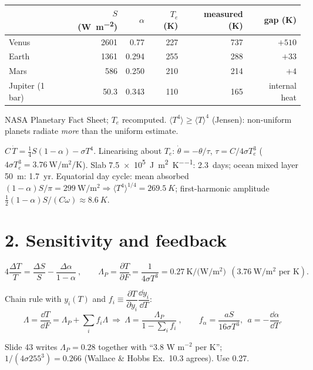\documentclass[10pt]{article}
\begin{document}
\begin{tabular}{@{}lrrrrr@{}}
\toprule
 & $S$ (\si{\watt\per\square\metre}) & $\alpha$ & $T_e$ (K) & measured (K) & gap (K)\\
\midrule
Venus & 2601 & 0.77 & 227 & 737 & $+510$\\
Earth & 1361 & 0.294 & 255 & 288 & $+33$\\
Mars & 586 & 0.250 & 210 & 214 & $+4$\\
Jupiter (1 bar) & 50.3 & 0.343 & 110 & 165 & internal heat\\
\bottomrule
\end{tabular}

\smallskip
NASA Planetary Fact Sheet; $T_e$ recomputed. $\langle T^4\rangle\ge\langle T\rangle^4$ (Jensen): non-uniform planets radiate \emph{more} than the uniform estimate.

\begin{derivbox}
$C\,\dot T=\tfrac14S(1-\alpha)-\sigma T^4$. Linearising about $T_e$: $\dot\theta=-\theta/\tau$, $\tau=C/4\sigma T_e^3$ ($4\sigma T_e^3=\SI{3.76}{\watt\per\square\metre\per\kelvin}$).
Slab \SI{7.5e5}{\joule\per\square\metre\per\kelvin}: \SI{2.3}{days}; ocean mixed layer \SI{50}{m}: \SI{1.7}{yr}.
Equatorial day cycle: mean absorbed $(1-\alpha)S/\pi=\SI{299}{\watt\per\square\metre}\Rightarrow \langle T^4\rangle^{1/4}=\SI{269.5}{K}$; first-harmonic amplitude $\tfrac12(1-\alpha)S/(C\omega)\approx\SI{8.6}{K}$.
\end{derivbox}

\section*{2. Sensitivity and feedback}
\begin{keybox}
\[
4\frac{\Delta T}{T}=\frac{\Delta S}{S}-\frac{\Delta\alpha}{1-\alpha}\ ,\qquad
\Lambda_P=\frac{\partial T}{\partial F}=\frac{1}{4\sigma T^3}=\SI{0.27}{\kelvin\per(\watt\per\square\metre)}\ \ (\SI{3.76}{\watt\per\square\metre} \text{ per K}).
\]
\end{keybox}

Chain rule with $y_i(T)$ and $f_i\equiv\dfrac{\partial T}{\partial y_i}\dfrac{\dd y_i}{\dd T}$:
\[
\Lambda=\frac{\dd T}{\dd F}=\Lambda_P+\sum_if_i\Lambda\ \Longrightarrow\ \boxed{\Lambda=\frac{\Lambda_P}{1-\sum_if_i}}\ ,\qquad
f_\alpha=\frac{aS}{16\sigma T^3},\ \ a=-\frac{\dd\alpha}{\dd T}.
\]

\begin{verifybox}[0.27 or 0.28?]
Slide 43 writes $\Lambda_P=0.28$ together with ``3.8 W m$^{-2}$ per K''; $1/(4\sigma 255^3)=0.266$ (Wallace \& Hobbs Ex.\ 10.3 agrees). Use 0.27.
\end{verifybox}
\end{document}
